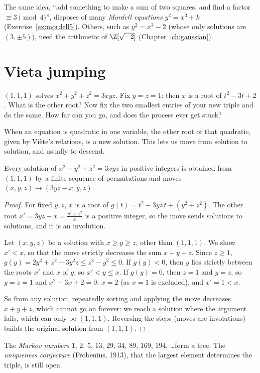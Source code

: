The same idea, ``add something to make a sum of two squares, and find a factor $\equiv3\pmod4$'', disposes of many \emph{Mordell equations} $y^2=x^3+k$ (Exercise~\ref{ex:mordell5}). Others, such as $y^2=x^3-2$ (whose only solutions are $(3,\pm5)$), need the arithmetic of $\Z[\sqrt{-2}]$ (Chapter~\ref{ch:gaussian}).

\section{Vieta jumping}

\begin{think}
$(1,1,1)$ solves $x^2+y^2+z^2=3xyz$. Fix $y=z=1$: then $x$ is a root of $t^2-3t+2$. What is the other root? Now fix the two smallest entries of your new triple and do the same. How far can you go, and does the process ever get stuck?
\end{think}

When an equation is quadratic in one variable, the other root of that quadratic, given by Vi\`ete's relations, is a new solution. This lets us move from solution to solution, and usually to descend.

\begin{theorem}[Markov, 1879]\label{thm:markov}
Every solution of $x^2+y^2+z^2=3xyz$ in positive integers is obtained from $(1,1,1)$ by a finite sequence of permutations and moves $(x,y,z)\mapsto(3yz-x,y,z)$.
\end{theorem}
\begin{proof}
For fixed $y,z$, $x$ is a root of $g(t)=t^2-3yz\,t+(y^2+z^2)$. The other root $x'=3yz-x=\frac{y^2+z^2}x$ is a positive integer, so the move sends solutions to solutions, and it is an involution.

Let $(x,y,z)$ be a solution with $x\ge y\ge z$, other than $(1,1,1)$. We show $x'<x$, so that the move strictly decreases the sum $x+y+z$. Since $z\ge1$, $g(y)=2y^2+z^2-3y^2z\le z^2-y^2\le0$. If $g(y)<0$, then $y$ lies strictly between the roots $x'$ and $x$ of $g$, so $x'<y\le x$. If $g(y)=0$, then $z=1$ and $y=z$, so $y=z=1$ and $x^2-3x+2=0$: $x=2$ (as $x=1$ is excluded), and $x'=1<x$.

So from any solution, repeatedly sorting and applying the move decreases $x+y+z$, which cannot go on forever: we reach a solution where the argument fails, which can only be $(1,1,1)$. Reversing the steps (moves are involutions) builds the original solution from $(1,1,1)$.
\end{proof}

The \emph{Markov numbers} $1$, $2$, $5$, $13$, $29$, $34$, $89$, $169$, $194$, \dots form a tree. The \emph{uniqueness conjecture} (Frobenius, 1913), that the largest element determines the triple, is still open.


